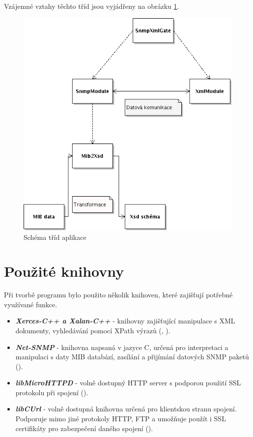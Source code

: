 Vzájemné vztahy těchto tříd jsou vyjádřeny na obrázku \ref{obr_impl_vztahy_trid}.

\begin{figure}[htp]
	\begin{center}
		\includegraphics[width=12cm]{obrazky/05_schema_trid.png}
		\caption{Schéma tříd aplikace}
		\label{obr_impl_vztahy_trid}
	\end{center}
\end{figure}


\section{Použité knihovny}
Při tvorbě programu bylo použito několik knihoven, které zajišťují potřebné využívané funkce.

\begin{itemize}
	\item \textbf{ \textit{Xerces-C++ a Xalan-C++} } - knihovny zajišťující manipulace s XML dokumenty, vyhledávání pomocí XPath výrazů (\cite{xerces}, \cite{xalan}).
	\item \textbf{ \textit{Net-SNMP} } - knihovna napsaná v jazyce C, určená pro interpretaci a manipulaci s daty MIB databází, zasílání a 
	přijímání datových SNMP paketů (\cite{net_snmp}).
	\item \textbf{ \textit{libMicroHTTPD} } - volně dostupný HTTP server s podporou použití SSL protokolu při spojení (\cite{libmicrohttpd}).
	\item \textbf{ \textit{libCUrl} } - volně dostupná knihovna určená pro klientskou stranu spojení. Podporuje mimo jiné protokoly HTTP, FTP a
	umožňuje použít i SSL certifikáty pro zabezpečení daného spojení (\cite{libcurl}).
\end{itemize}


